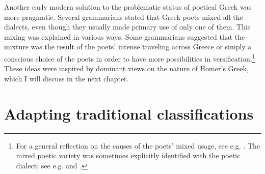 Another early modern solution to the problematic status of poetical Greek was more pragmatic. Several grammarians stated that Greek poets mixed all the dialects, even though they usually made primary use of only one of them. This mixing was explained in various ways. Some grammarians suggested that the mixture was the result of the poets’ intense traveling across Greece or simply a conscious choice of the poets in order to have more possibilities in versification.\footnote{For a general reflection on the causes of the poets’ mixed usage, see e.g. \citet[*.3\textsc{\textsuperscript{r}}–*.4\textsc{\textsuperscript{r}}]{Gottleber1765}. The mixed poetic variety was sometimes explicitly identified with the poetic dialect; see e.g. \citet[111]{Bayly1756} and \citet[198]{Peternader1776}.} These ideas were inspired by dominant views on the nature of Homer’s Greek, which I will discuss in the next chapter.

\section{Adapting traditional classifications}\label{sec:2.8}

